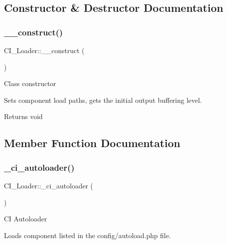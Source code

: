 \subsection{Constructor \& Destructor Documentation}
\mbox{\label{class_c_i___loader_a56d6528e81d45b264b76394c89f062ce}} 
\subsubsection{\texorpdfstring{\+\_\+\+\_\+construct()}{\_\_construct()}}
{\footnotesize\ttfamily C\+I\+\_\+\+Loader\+::\+\_\+\+\_\+construct (\begin{DoxyParamCaption}{ }\end{DoxyParamCaption})}

Class constructor

Sets component load paths, gets the initial output buffering level.

\begin{DoxyReturn}{Returns}
void 
\end{DoxyReturn}


\subsection{Member Function Documentation}
\mbox{\label{class_c_i___loader_affd5b69b8d0f2883d89255967eba7129}} 
\subsubsection{\texorpdfstring{\+\_\+ci\+\_\+autoloader()}{\_ci\_autoloader()}}
{\footnotesize\ttfamily C\+I\+\_\+\+Loader\+::\+\_\+ci\+\_\+autoloader (\begin{DoxyParamCaption}{ }\end{DoxyParamCaption})\hspace{0.3cm}{\ttfamily [protected]}}

CI Autoloader

Loads component listed in the config/autoload.\+php file.

